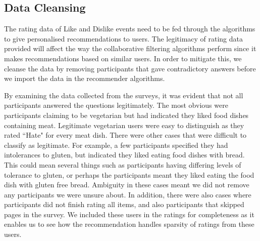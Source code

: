 % 

\subsection{Data Cleansing}

The rating data of Like and Dislike events need to be fed through the algorithms to give personalised recommendations to users. The legitimacy of rating data provided will affect the way the collaborative filtering algorithms perform since it makes recommendations based on similar users. In order to mitigate this, we cleanse the data by removing participants that gave contradictory answers before we import the data in the recommender algorithms.


By examining the data collected from the surveys, it was evident that not all participants answered the questions legitimately. The most obvious were participants claiming to be vegetarian but had indicated they liked food dishes containing meat. Legitimate vegetarian users were easy to distinguish as they rated ``Hate" for every meat dish. There were other cases that were difficult to classify as legitimate. For example, a few participants specified they had intolerances to gluten, but indicated they liked eating food dishes with bread. This could mean several things such as participants having differing levels of tolerance to gluten, or perhaps the participants meant they liked eating the food dish with gluten free bread. Ambiguity in these cases meant we did not remove any participants we were unsure about. In addition, there were also cases where participants did not finish rating all items, and also participants that skipped pages in the survey. We included these users in the ratings for completeness as it enables us to see how the recommendation handles sparsity of ratings from these users. 

